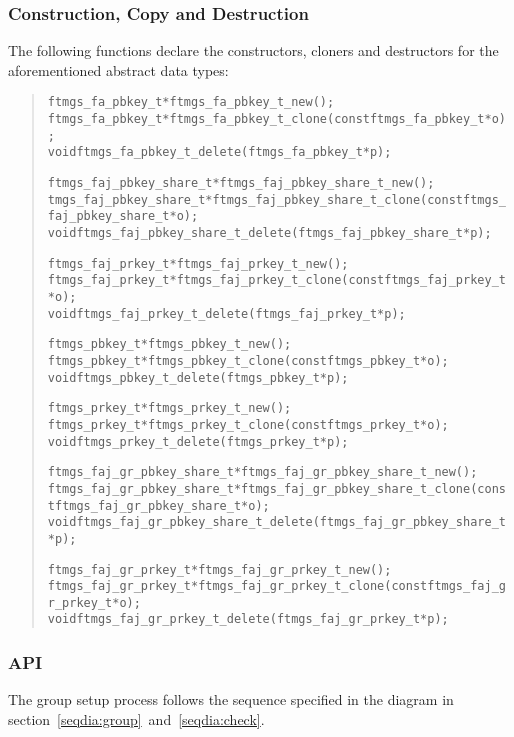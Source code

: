 \documentclass[a4paper]{article}
\newenvironment{code}%
{\begin{quote}\footnotesize\begin{alltt}}%
{\end{alltt}\end{quote}}%
\begin{document}
\subsubsection*{Construction, Copy and Destruction}
The following functions declare the constructors, cloners and destructors
for the aforementioned abstract data types:
\begin{code}
ftmgs_fa_pbkey_t* ftmgs_fa_pbkey_t_new();
ftmgs_fa_pbkey_t* ftmgs_fa_pbkey_t_clone(const ftmgs_fa_pbkey_t* o);
void ftmgs_fa_pbkey_t_delete(ftmgs_fa_pbkey_t* p);

ftmgs_faj_pbkey_share_t* ftmgs_faj_pbkey_share_t_new();
tmgs_faj_pbkey_share_t* ftmgs_faj_pbkey_share_t_clone(const ftmgs_faj_pbkey_share_t* o);
void ftmgs_faj_pbkey_share_t_delete(ftmgs_faj_pbkey_share_t* p);

ftmgs_faj_prkey_t* ftmgs_faj_prkey_t_new();
ftmgs_faj_prkey_t* ftmgs_faj_prkey_t_clone(const ftmgs_faj_prkey_t* o);
void ftmgs_faj_prkey_t_delete(ftmgs_faj_prkey_t* p);

ftmgs_pbkey_t* ftmgs_pbkey_t_new();
ftmgs_pbkey_t* ftmgs_pbkey_t_clone(const ftmgs_pbkey_t* o);
void ftmgs_pbkey_t_delete(ftmgs_pbkey_t* p);

ftmgs_prkey_t* ftmgs_prkey_t_new();
ftmgs_prkey_t* ftmgs_prkey_t_clone(const ftmgs_prkey_t* o);
void ftmgs_prkey_t_delete(ftmgs_prkey_t* p);

ftmgs_faj_gr_pbkey_share_t* ftmgs_faj_gr_pbkey_share_t_new();
ftmgs_faj_gr_pbkey_share_t* ftmgs_faj_gr_pbkey_share_t_clone(const ftmgs_faj_gr_pbkey_share_t* o);
void ftmgs_faj_gr_pbkey_share_t_delete(ftmgs_faj_gr_pbkey_share_t* p);

ftmgs_faj_gr_prkey_t* ftmgs_faj_gr_prkey_t_new();
ftmgs_faj_gr_prkey_t* ftmgs_faj_gr_prkey_t_clone(const ftmgs_faj_gr_prkey_t* o);
void ftmgs_faj_gr_prkey_t_delete(ftmgs_faj_gr_prkey_t* p);
\end{code}
\subsubsection*{API}
The group setup process follows the sequence specified in the diagram in
section~\ref{seqdia:group}~and~\ref{seqdia:check}.
\end{document}
